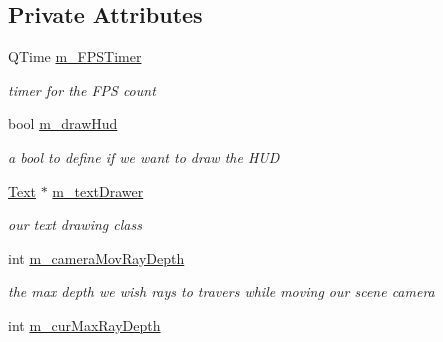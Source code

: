 \subsection*{Private Attributes}
\begin{DoxyCompactItemize}
\item 
\hypertarget{class_open_g_l_widget_a21fd782375d418bbb788cd0eb22b19dc}{Q\-Time \hyperlink{class_open_g_l_widget_a21fd782375d418bbb788cd0eb22b19dc}{m\-\_\-\-F\-P\-S\-Timer}}\label{class_open_g_l_widget_a21fd782375d418bbb788cd0eb22b19dc}

\begin{DoxyCompactList}\small\item\em timer for the F\-P\-S count \end{DoxyCompactList}\item 
\hypertarget{class_open_g_l_widget_ac8436834fe05768ad49eee8a522f7013}{bool \hyperlink{class_open_g_l_widget_ac8436834fe05768ad49eee8a522f7013}{m\-\_\-draw\-Hud}}\label{class_open_g_l_widget_ac8436834fe05768ad49eee8a522f7013}

\begin{DoxyCompactList}\small\item\em a bool to define if we want to draw the H\-U\-D \end{DoxyCompactList}\item 
\hypertarget{class_open_g_l_widget_aeea0e73b6a7ea9759806929c37f1b61a}{\hyperlink{class_text}{Text} $\ast$ \hyperlink{class_open_g_l_widget_aeea0e73b6a7ea9759806929c37f1b61a}{m\-\_\-text\-Drawer}}\label{class_open_g_l_widget_aeea0e73b6a7ea9759806929c37f1b61a}

\begin{DoxyCompactList}\small\item\em our text drawing class \end{DoxyCompactList}\item 
\hypertarget{class_open_g_l_widget_a5ca2617423c554223f59a9b259d81db1}{int \hyperlink{class_open_g_l_widget_a5ca2617423c554223f59a9b259d81db1}{m\-\_\-camera\-Mov\-Ray\-Depth}}\label{class_open_g_l_widget_a5ca2617423c554223f59a9b259d81db1}

\begin{DoxyCompactList}\small\item\em the max depth we wish rays to travers while moving our scene camera \end{DoxyCompactList}\item 
\hypertarget{class_open_g_l_widget_ab6979335ff8d4cf73479622b229c1c7c}{int \hyperlink{class_open_g_l_widget_ab6979335ff8d4cf73479622b229c1c7c}{m\-\_\-cur\-Max\-Ray\-Depth}}\label{class_open_g_l_widget_ab6979335ff8d4cf73479622b229c1c7c}


\end{DoxyCompactItemize}
